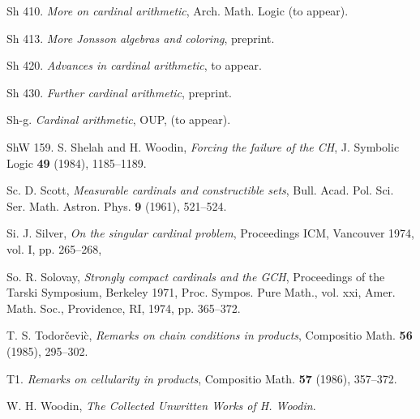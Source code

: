 \REF Sh 410. {\Bysame} {\it More on cardinal arithmetic\/},
Arch. Math. Logic (to appear).
 
\REF Sh 413. {\Bysame} {\it More Jonsson algebras and 
coloring\/}, preprint.
 
\REF Sh 420. {\Bysame} {\it Advances in cardinal 
arithmetic\/}, to appear.
 
\REF Sh 430. {\Bysame} {\it Further cardinal 
arithmetic\/}, preprint.
 
\REF Sh-g. {\Bysame} {\it Cardinal arithmetic\/}, OUP, (to 
appear).
 
\REF ShW 159. S. Shelah and H. Woodin, {\it Forcing the 
failure of the
CH\/}, J. Symbolic Logic {\bf 49} (1984), 1185--1189.
 
\REF Sc. D. Scott, {\it Measurable cardinals and 
constructible sets\/},
Bull. Acad. Pol. Sci. Ser. Math. Astron. Phys. {\bf 9} 
(1961),
521--524.
 
\REF Si. J. Silver, {\it On the singular cardinal 
problem\/},
Proceedings ICM, Vancouver 1974, vol. I, pp. 265--268,
 
\REF So. R. Solovay, {\it Strongly compact cardinals and 
the GCH\/},
Proceedings of the Tarski Symposium, Berkeley 1971,
Proc. Sympos. Pure Math., vol. xxi, Amer. Math. Soc., 
Providence,
RI, 1974,
pp. 365--372.
 
\REF T. S. Todor\v cevi\`c, {\it Remarks on chain 
conditions in
products\/}, Compositio Math. {\bf 56} (1985), 295--302.
 
\REF T1. {\Bysame} {\it Remarks on cellularity in 
products\/}, Compositio
Math. {\bf 57} (1986), 357--372.
 
\REF W. H. Woodin, {\it The Collected Unwritten Works of 
H. Woodin\/}.

\endRefs
\enddocument

